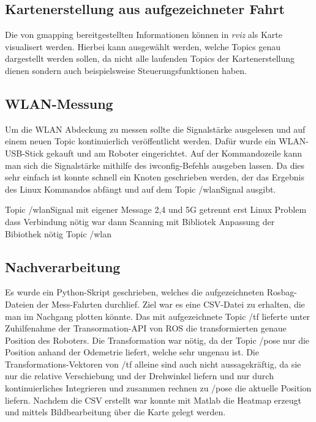 \documentclass{scrartcl}%
\begin{document}
\subsection{Kartenerstellung aus aufgezeichneter Fahrt}
Die von gmapping bereitgestellten Informationen können in \textit{rviz} als Karte visualisert werden. Hierbei kann ausgewählt werden, welche Topics genau dargestellt werden sollen, da nicht alle laufenden Topics der Kartenerstellung dienen sondern auch beispielsweise Steuerungsfunktionen haben.

\subsection{WLAN-Messung}
Um die WLAN Abdeckung zu messen sollte die Signalstärke ausgelesen und auf einem neuen Topic kontinuierlich veröffentlicht werden. Dafür wurde ein WLAN-USB-Stick gekauft und am Roboter eingerichtet. Auf der Kommandozeile kann man sich die Signalstärke mithilfe des iwconfig-Befehls ausgeben lassen. Da dies sehr einfach ist konnte schnell ein Knoten geschrieben werden, der das Ergebnis des Linux Kommandos abfängt und auf dem Topic /wlanSignal ausgibt.


Topic /wlanSignal mit eigener Message
2,4 und 5G getrennt
erst Linux
Problem dass Verbindung nötig war
dann Scanning mit Bibliotek
Anpassung der Bibiothek nötig
Topic /wlan



\subsection{Nachverarbeitung}
Es wurde ein Python-Skript geschrieben, welches die aufgezeichneten Rosbag-Dateien der Mess-Fahrten durchlief. Ziel war es eine CSV-Datei zu erhalten, die man im Nachgang plotten könnte. Das mit aufgezeichnete Topic /tf lieferte unter Zuhilfenahme der Transormation-API von ROS die transformierten genaue Position des Roboters. Die Transformation war nötig, da der Topic /pose nur die Position anhand der Odemetrie liefert, welche sehr ungenau ist. Die Transformations-Vektoren von /tf alleine sind auch nicht aussagekräftig, da sie nur die relative Verschiebung und der Drehwinkel liefern und nur durch kontinuierliches Integrieren und zusammen rechnen zu /pose die aktuelle Position liefern. Nachdem die CSV erstellt war konnte mit Matlab die Heatmap erzeugt und mittels Bildbearbeitung über die Karte gelegt werden.

\newpage
\end{document}
